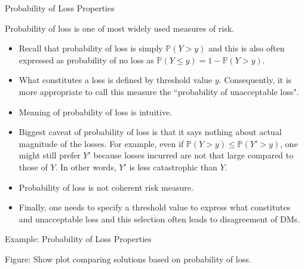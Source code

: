 \documentclass[9pt]{beamer}
\begin{document}
%
\begin{frame}{Probability of Loss Properties}


Probability of loss is one of most widely used measures of risk.  

\begin{itemize}

\item Recall that probability of loss is simply $\mathbb{P}(Y>y)$ and this is also often expressed as probability of no loss as $\mathbb{P}(Y\leq y)=1-\mathbb{P}(Y>y)$. 

\item What constitutes a loss is defined by threshold value $y$. Consequently, it is more appropriate to call this measure the  ``probability of unacceptable loss". 

\item Meaning of probability of loss is intuitive. 

\item Biggest caveat of probability of loss is that it says nothing about actual magnitude of the losses.  For example, even if $\mathbb{P}(Y>y)\leq \mathbb{P}(Y'>y)$, one might still prefer $Y'$ because losses incurred are not that large compared to those of $Y$.  In other words, $Y'$ is less catastrophic than $Y$. 

\item Probability of loss is not coherent risk measure. 

\item Finally, one needs to specify a threshold value to express what constitutes and unacceptable loss and this selection often leads to disagreement of DMs.

\end{itemize}

\end{frame}

%
\begin{frame}{Example: Probability of Loss Properties}

\begin{block}{}
Figure: Show plot comparing solutions based on probability of loss. 
\end{block}

\end{frame}
\end{document}
